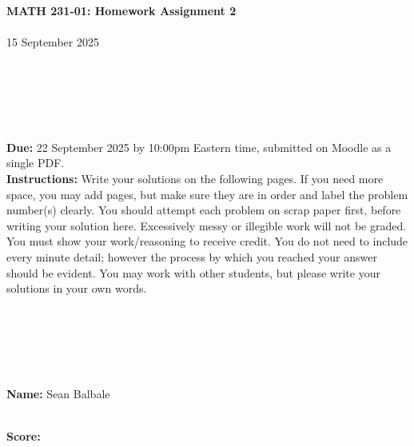 \documentclass[reqno, 12pt]{amsart}
\begin{document}
\begin{center}
    {\bf MATH 231-01: Homework Assignment 2}\\~\\
    15 September 2025\\~\\~\\~\\~\\~\\
\end{center}

{\bf Due:} 22 September 2025 by 10:00pm Eastern time, submitted on Moodle as a single PDF.~\\


{\bf Instructions:} Write your solutions on the following pages. If you need more space, you may add pages, but make sure they are in order and label the problem number(s) clearly. You should attempt each problem on scrap paper first, before writing your solution here. Excessively messy or illegible work will not be graded. You must show your work/reasoning to receive credit. You do not need to include every minute detail; however the process by which you reached your answer should be evident. You may work with other students, but please write your solutions in your own words.

~\\~\\~\\~\\~\\
{\bf Name:} Sean Balbale

~\\
{\bf Score:}
\end{document}
